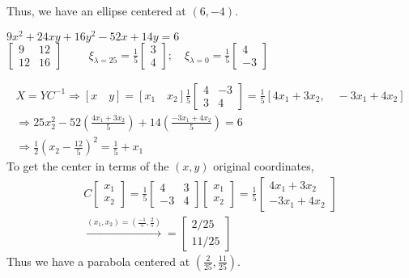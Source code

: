 \documentclass[twoside]{amsart}
\theoremstyle{plain}
\theoremstyle{definition}
\newcommand{\exercisehead}[1]
  {
   \noindent{\small\bf Exercise #1.}
   \smallskip}
\begin{document}
Thus, we have an ellipse centered at $(6,-4)$.  

\exercisehead{13} $9x^2 + 24xy +16 y^2 - 52 x + 14y = 6$  \medskip \\
$\left[ \begin{matrix} 9 & 12 \\ 12 & 16 \end{matrix} \right]$  $\quad \quad \xi_{\lambda = 25} = \frac{1}{5} \left[ \begin{matrix} 3 \\ 4 \end{matrix} \right]; \quad \xi_{\lambda = 0 } = \frac{1}{5} \left[ \begin{matrix} 4 \\ -3 \end{matrix} \right]$  

\[
\begin{gathered}
  X = YC^{-1} \Longrightarrow [ x \quad y ] = [ x_1 \quad x_2 ] \frac{1}{5} \left[ \begin{matrix} 4 & -3 \\ 3 & 4 \end{matrix} \right] = \frac{1}{5} [ 4 x_1 + 3 x_2, \quad -3x_1 + 4 x_2 ] \\
  \Longrightarrow 25 x_2^2 - 52 \left( \frac{ 4x_1 + 3x_2}{ 5 } \right) + 14 \left( \frac{-3x_1 + 4x_2}{ 5 } \right) = 6 \\
  \Longrightarrow \frac{1}{2} (x_2 - \frac{12}{5} )^2 = \frac{1}{5} + x_1 
\end{gathered}
\]
To get the center in terms of the $(x,y)$ original coordinates,
\[
\begin{gathered}
C \left[ \begin{matrix} x_1 \\ x_2 \end{matrix} \right] = \frac{1}{5} \left[ \begin{matrix} 4 & 3 \\ -3 & 4 \end{matrix} \right] \left[ \begin{matrix} x_1 \\ x_2 \end{matrix} \right] = \frac{1}{5} \left[ \begin{matrix} 4 x_1 + 3 x_2 \\ -3 x_1 + 4 x_2 \end{matrix} \right] \\
\xrightarrow{ (x_1,x_2) = \left( \frac{-1}{5} , \frac{2}{5} \right)} = \left[ \begin{matrix} 2/25 \\ 11/25 \end{matrix} \right]
\end{gathered}
\]
Thus we have a parabola centered at $\left( \frac{2}{25}, \frac{11}{25} \right)$.  
\end{document}
